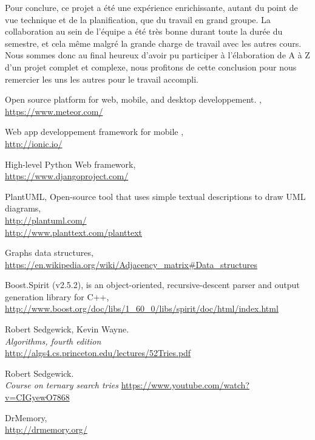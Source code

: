 \documentclass[french]{article}
\begin{document}
		Pour conclure, ce projet a été une expérience enrichissante, autant du point de vue technique et de la planification, que du travail en grand groupe. La collaboration au sein de l'équipe a été très bonne durant toute la durée du semestre, et cela même malgré la grande charge de travail avec les autres cours. Nous sommes donc au final heureux d'avoir pu participer à l'élaboration de A à Z d'un projet complet et complexe, nous profitons de cette conclusion pour nous remercier les uns les autres pour le travail accompli.
		
		\newpage
	
	\newpage
	

			
	
	\listoffigures
			
	\begin{thebibliography}{9}
		Open source platform for web, mobile, and desktop developpement. ,\\ \url{https://www.meteor.com/}
		
		Web app developpement framework for mobile ,\\ \url{http://ionic.io/}
		
		High-level Python Web framework, \\ \url{https://www.djangoproject.com/}
		
		PlantUML, Open-source tool that uses simple textual descriptions to draw UML diagrams,\\ \url{http://plantuml.com/}\\ \url{http://www.planttext.com/planttext}
		
		Graphs data structures,\\ \url{https://en.wikipedia.org/wiki/Adjacency_matrix#Data_structures}
		
		Boost.Spirit (v2.5.2), is an object-oriented, recursive-descent parser and output generation library for C++,\\ \url{http://www.boost.org/doc/libs/1_60_0/libs/spirit/doc/html/index.html}
		
		Robert Sedgewick, Kevin Wayne.\\
		\emph{Algorithms, fourth edition}\\
		\url{http://algs4.cs.princeton.edu/lectures/52Tries.pdf}
		
		Robert Sedgewick.\\
		\emph{Course on ternary search tries}
		\url{https://www.youtube.com/watch?v=CIGyewO7868}
		
		DrMemory,\\
		\url{http://drmemory.org/}
	\end{thebibliography}
			
\end{document}
